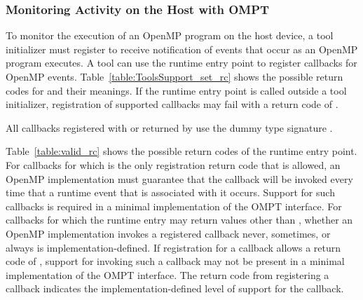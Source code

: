 \subsubsection{Monitoring Activity on the Host with OMPT}
\label{sec:ompt-register-callbacks}

To monitor the execution of an OpenMP program on the host device, a tool 
initializer must register to receive notification of events that occur as 
an OpenMP program executes. A tool can use the  
runtime entry point to register callbacks for OpenMP events.  
Table~\ref{table:ToolsSupport_set_rc} shows the possible return codes for
 and their meanings. If the  
runtime entry point is called outside a tool initializer, registration of 
supported callbacks may fail with a return code of .

All callbacks registered with  or returned
by  use the dummy type signature .

Table~\ref{table:valid_rc} shows the possible return codes of the  
 runtime entry point. For callbacks for which
 is the only registration return code that is 
allowed, an OpenMP implementation must guarantee that the callback will be
invoked every time that a runtime event that is associated with it occurs. 
Support for such callbacks is required in a minimal implementation of the
OMPT interface. For callbacks for which the  runtime
entry may return values other than , whether an OpenMP 
implementation invokes a registered callback never, sometimes, or always is 
implementation-defined. If registration for a callback allows a return code 
of , support for invoking such a callback may not be 
present in a minimal implementation of the OMPT interface. The return code 
from registering a callback indicates the implementation-defined level of 
support for the callback.

